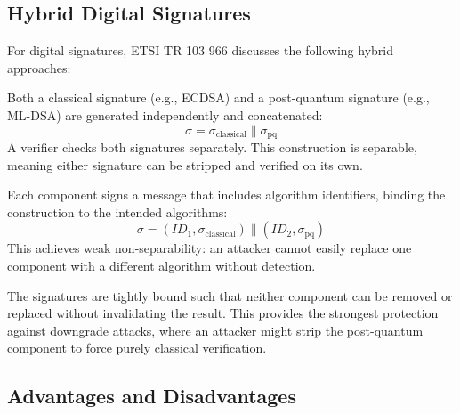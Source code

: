 \documentclass[11pt,a4paper]{article}
\begin{document}
\subsection{Hybrid Digital Signatures}

For digital signatures, ETSI TR 103 966 discusses the following hybrid approaches:

\begin{description}[style=nextline]
    \item[Concatenation Only (Separable)]
    Both a classical signature (e.g., ECDSA) and a post-quantum signature (e.g., ML-DSA) are generated independently and concatenated:
    \[
    \sigma = \sigma_{\text{classical}} \parallel \sigma_{\text{pq}}
    \]
    A verifier checks both signatures separately. This construction is separable, meaning either signature can be stripped and verified on its own.

    \item[Concatenation with Identifiers (Weak Non-Separability)]
    Each component signs a message that includes algorithm identifiers, binding the construction to the intended algorithms:
    \[
    \sigma = (\mathit{ID}_1, \sigma_{\text{classical}}) \parallel (\mathit{ID}_2, \sigma_{\text{pq}})
    \]
    This achieves weak non-separability: an attacker cannot easily replace one component with a different algorithm without detection.

    \item[Strong Non-Separability]
    The signatures are tightly bound such that neither component can be removed or replaced without invalidating the result. This provides the strongest protection against downgrade attacks, where an attacker might strip the post-quantum component to force purely classical verification.
\end{description}

\subsection{Advantages and Disadvantages}
\end{document}
